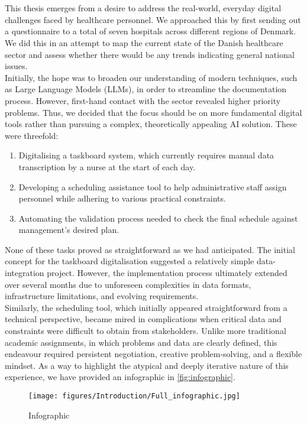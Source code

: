 \\
\\
This thesis emerges from a desire to address the real-world, everyday digital challenges faced by healthcare personnel. We approached this by first sending out a questionnaire to a total of seven hospitals across different regions of Denmark. We did this in an attempt to map the current state of the Danish healthcare sector and assess whether there would be any trends indicating general national issues.
\\
Initially, the hope was to broaden our understanding of modern techniques, such as Large Language Models (LLMs), in order to streamline the documentation process. However, first-hand contact with the sector revealed higher priority problems. Thus, we decided that the focus should be on more fundamental digital tools rather than pursuing a complex, theoretically appealing AI solution. These were threefold:
\begin{enumerate}
    \item Digitalising a taskboard system, which currently requires manual data transcription by a nurse at the start of each day.
    \item Developing a scheduling assistance tool to help administrative staff assign personnel while adhering to various practical constraints.
    \item Automating the validation process needed to check the final schedule against management's desired plan.
\end{enumerate}
None of these tasks proved as straightforward as we had anticipated. The initial concept for the taskboard digitalisation suggested a relatively simple data-integration project. However, the implementation process ultimately extended over several months due to unforeseen complexities in data formats, infrastructure limitations, and evolving requirements.
\\
Similarly, the scheduling tool, which initially appeared straightforward from a technical perspective, became mired in complications when critical data and constraints were difficult to obtain from stakeholders. Unlike more traditional academic assignments, in which problems and data are clearly defined, this endeavour required persistent negotiation, creative problem-solving, and a flexible mindset. As a way to highlight the atypical and deeply iterative nature of this experience, we have provided an infographic in \autoref{fig:infographic}.

\begin{figure}[H]
    \centering
    \texttt{[image: figures/Introduction/Full\_infographic.jpg]}
    \caption{Infographic}
    \label{fig:infographic}
\end{figure}

